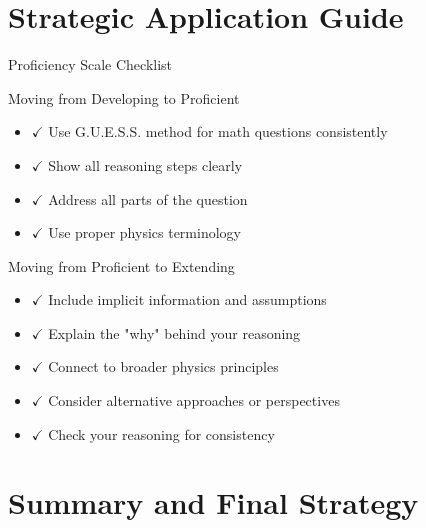 \documentclass{beamer}
\begin{document}
\section{Strategic Application Guide}


\begin{frame}{Proficiency Scale Checklist}
\begin{block}{Moving from Developing to Proficient}
\begin{itemize}
\item $\checkmark$ Use G.U.E.S.S. method for math questions consistently \pause
\item $\checkmark$ Show all reasoning steps clearly \pause
\item $\checkmark$ Address all parts of the question \pause
\item $\checkmark$ Use proper physics terminology
\end{itemize}
\end{block}

\pause
\begin{block}{Moving from Proficient to Extending}
\begin{itemize}
\item $\checkmark$ Include implicit information and assumptions \pause
\item $\checkmark$ Explain the "why" behind your reasoning \pause
\item $\checkmark$ Connect to broader physics principles \pause
\item $\checkmark$ Consider alternative approaches or perspectives \pause
\item $\checkmark$ Check your reasoning for consistency
\end{itemize}
\end{block}
\end{frame}

\section{Summary and Final Strategy}
\end{document}
